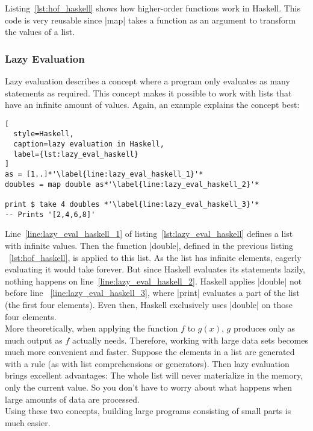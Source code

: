 Listing~\ref{lst:hof_haskell} shows how higher-order functions work in Haskell.
This code is very reusable since |map| takes a function as an argument to
transform the values of a list.

\subsubsection{Lazy Evaluation} %
\label{subsub:Evaluation}
Lazy evaluation describes a concept where a program only evaluates as many
statements as required. This concept makes it possible to work with lists that
have an infinite amount of values. Again, an example explains the concept best:

\begin{lstlisting}[
  style=Haskell,
  caption=lazy evaluation in Haskell,
  label={lst:lazy_eval_haskell}
]
as = [1..]*'\label{line:lazy_eval_haskell_1}'*
doubles = map double as*'\label{line:lazy_eval_haskell_2}'*

print $ take 4 doubles *'\label{line:lazy_eval_haskell_3}'*
-- Prints '[2,4,6,8]'
\end{lstlisting}
Line~\ref{line:lazy_eval_haskell_1} of listing~\ref{lst:lazy_eval_haskell}
defines a list with infinite values. Then the function |double|, defined in the
previous listing ~\ref{lst:hof_haskell}, is applied to this list. As the list
has infinite elements, eagerly evaluating it would take forever. But since
Haskell evaluates its statements lazily, nothing happens on
line~\ref{line:lazy_eval_haskell_2}. Haskell applies |double| not before line
~\ref{line:lazy_eval_haskell_3}, where |print| evaluates a part of the list (the
first four elements). Even then, Haskell exclusively uses |double| on those
four elements.\\
More theoretically, when applying the function $f$ to $g(x)$, $g$ produces only
as much output as $f$ actually needs. Therefore, working with large data sets
becomes much more convenient and faster. Suppose the elements in a list are
generated with a rule (as with list comprehensions or generators). Then lazy
evaluation brings excellent advantages: The whole list will never materialize
in the memory, only the current value. So you don't have to worry about what
happens when large amounts of data are processed. \\ Using these two concepts,
building large programs consisting of small parts is much easier.


